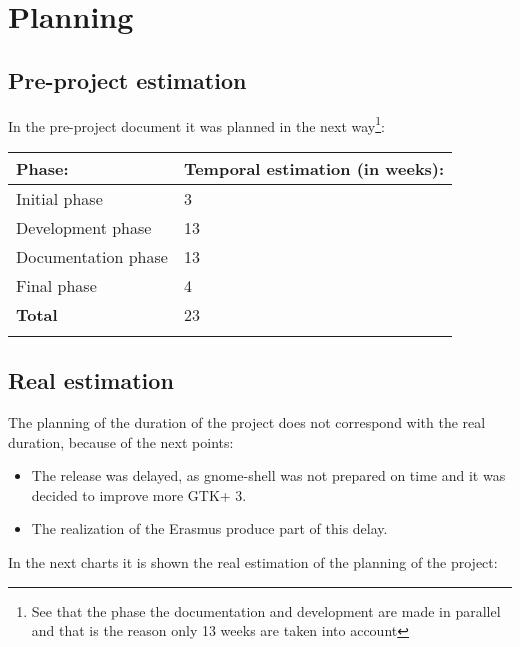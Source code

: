 
\chapter{Planning}

\section{Pre-project estimation}

In the pre-project document it was planned in the next way\footnote{See that the phase the documentation and development are made in parallel and that is the reason only 13 weeks are taken into account}:

\begin{center}
  \begin{tabularx}{0.60\textwidth}{|X|X|}
    \firsthline
    \textbf{Phase:} & \textbf{Temporal estimation (in weeks):} \\
    \hline
    Initial phase & 3 \\
    \hline
    Development phase & 13 \\
    \hline
    Documentation phase & 13 \\
    \hline
    Final phase & 4 \\
    \hline
    \textbf{Total} & 23 \\
    \lasthline
  \end{tabularx}
\end{center}

\newpage
{}

\newpage
{}

\newpage
\section{Real estimation}

The planning of the duration of the project does not correspond with the real duration, because of the next points:
\begin{itemize}
  \item The \GNOME release was delayed, as gnome-shell was not prepared on time and it was decided to improve more GTK+ 3.
  \item The realization of the Erasmus produce part of this delay.
\end{itemize}

In the next charts it is shown the real estimation of the planning of the project:

